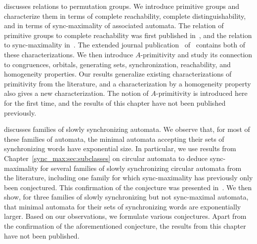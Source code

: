 discusses relations to permutation groups.
We introduce primitive groups and
characterize them in terms of complete reachability,
complete distinguishability, and in terms of sync-maximality
of associated automata.
The relation of primitive groups to complete reachability
was first published in~\cite{DBLP:conf/lata/Hoffmann21},
and the relation to sync-maximality in~\cite{DBLP:conf/dcfs/Hoffmann21}.
The extended journal publication~\cite{HoffmannLATAextended2} 
of~\cite{DBLP:conf/lata/Hoffmann21,DBLP:conf/dcfs/Hoffmann21} contains 
both of these characterizations.
We then introduce $A$-primitivity 
and study its connection to congruences, orbitals,
generating sets, synchronization, reachability,
and homogeneity properties.
Our results generalize existing characterizations
of primitivity from the literature,
and a characterization by
a homogeneity property also gives
a new characterization. 
The notion of $A$-primitivity is introduced here for the first time, and the results of this chapter have not been published previously.

 discusses families of slowly synchronizing
automata. We observe that, for most of these families of automata,
the minimal automata accepting their sets of synchronizing words
have exponential size. In particular,
we use results from Chapter~\ref{sync_max:sec:subclasses}
on circular automata to deduce sync-maximality
for several families of slowly synchronizing circular automata
from the literature, including one family for which 
sync-maximality has previously only been conjectured.
This confirmation of the conjecture was 
presented in~\cite{DBLP:conf/lata/Hoffmann21a,HoffmannCircularExtended}.
We then show, for three families of slowly synchronizing but not sync-maximal
automata, that minimal automata for their sets 
of synchronizing words are exponentially larger.
Based on our observations, we formulate various conjectures.
Apart from the confirmation of the aforementioned conjecture,
the results from this chapter have not been published.
